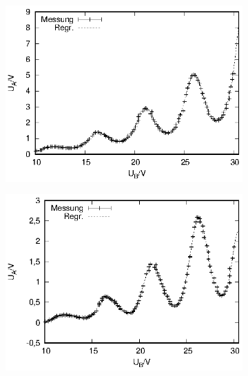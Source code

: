 \begin{figure}[!h]
  \centering
  \begin{subfigure}[h]{0.5\textwidth}
    \centering
    \includegraphics{data/fh/165K1V.eps}
  \end{subfigure}%
  \begin{subfigure}[h]{0.5\textwidth}
    \centering
    \includegraphics{data/fh/165K2V.eps}
  \end{subfigure}
    \begin{subfigure}[h]{0.5\textwidth}
    \centering

\end{subfigure}
\end{figure}
